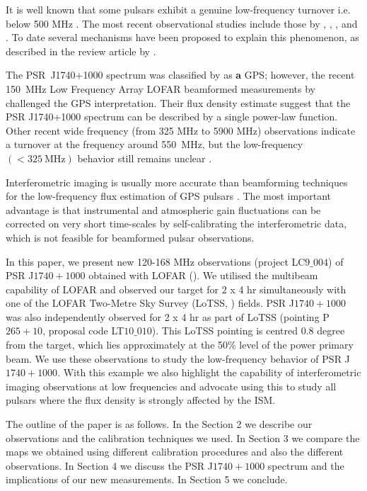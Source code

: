 \documentclass[manuscript]{aastex63}
\begin{document}
It is well known that some pulsars exhibit a genuine low-frequency turnover i.e. below 500 MHz \citep[see, for example,][and references therein]{1973Sieber,1996Malofeev,2003Kramer}. The most recent observational studies include those by \citet{2017Murphy}, \citet{2016Bilous}, \citet{2020Bilous}, and \citet{2020Bondonneau}. To date several mechanisms have been proposed to explain this phenomenon, as described in the review article by \citet{2002Sieber}.

The PSR~J1740$+$1000 spectrum was classified by \citealt{2014Dembska} as \textbf{a} GPS; however, the recent 150~MHz Low Frequency Array LOFAR beamformed measurements by \citet{2016Bilous} challenged the GPS interpretation. Their flux density estimate suggest that the PSR J1740+1000 spectrum can be described by a single power-law function. Other recent wide frequency (from 325 MHz to 5900 MHz) observations indicate a turnover at the frequency around 550~MHz, but the low-frequency $(<325~\mathrm{MHz})$ behavior still remains unclear \citep{2018Rozko}. 

Interferometric imaging is usually more accurate than beamforming techniques for the low-frequency flux estimation of GPS pulsars \citep{2016Basu,2017Kijak}. The most important advantage is that instrumental and atmospheric gain fluctuations can be corrected on very short time-scales by self-calibrating the interferometric data, which is not feasible for beamformed pulsar observations.

In this paper, we present new 120-168 MHz observations (project LC$9\_004$) of PSR J$1740+1000$ obtained with LOFAR (\citealt{2013vanHaarlem}). We utilised the multibeam capability of LOFAR and observed our target for 2 x 4 hr simultaneously with one of the LOFAR Two-Metre Sky Survey (LoTSS, \citealt{2017Shimwell}) fields. PSR J$1740+1000$ was also independently observed for 2 x 4 hr as part of LoTSS (pointing P$265+10$, proposal code LT$10\_010$). This LoTSS pointing is centred 0.8 degree from the target, which lies approximately at the 50\% level of the power primary beam. We use these observations to study the low-frequency behavior of PSR J$1740+1000$. 
With this example we also highlight the capability of interferometric imaging observations at low frequencies and advocate using this to study all pulsars where the flux density is strongly affected by the ISM. 

The outline of the paper is as follows. In the Section 2 we describe our observations and the calibration techniques we used. In Section 3 we compare the maps we obtained using different calibration procedures and also the different observations. In Section 4 we discuss the PSR J$1740+1000$ spectrum and the implications of our new measurements. In Section 5 we conclude.
\end{document}
